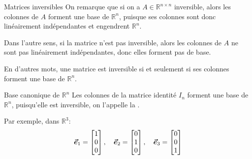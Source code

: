 \documentclass[a4paper]{article}
\begin{document}
\begin{parag}{Matrices inversibles}
    On remarque que si on a $A \in \mathbb{R}^{n \times n}$ inversible, alors les colonnes de $A$ forment une base de $\mathbb{R}^{n}$, puisque ses colonnes sont donc linéairement indépendantes et engendrent $\mathbb{R}^{n}.$

    Dans l'autre sens, si la matrice n'est pas inversible, alors les colonnes de $A$ ne sont pas linéairement indépendantes, donc elles forment pas de base.

    En d'autres mots, une matrice est inversible si et seulement si ses colonnes forment une base de $\mathbb{R}^{n}$.
\end{parag}

\begin{parag}{Base canonique de $\mathbb{R}^{n}$}
    Les colonnes de la matrice identité $I_n$ forment une base de $\mathbb{R}^n$, puisqu'elle est inversible, on l'appelle la .

    Par exemple, dans $\mathbb{R}^{3}$:
    \[\bm{\protect\vec{e}}_1 = \begin{bmatrix} 1 \\ 0 \\ 0 \end{bmatrix}, \quad \bm{\protect\vec{e}}_2 = \begin{bmatrix} 0 \\ 1 \\ 0 \end{bmatrix}, \quad \bm{\protect\vec{e}}_3 = \begin{bmatrix} 0 \\ 0 \\ 1 \end{bmatrix} \]

\end{parag}
\end{document}
